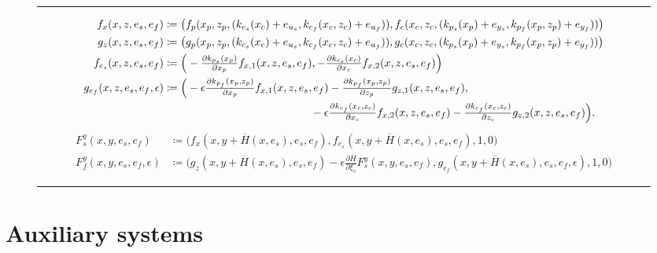 \begin{figure*}[!htp]
	\hrule
    \scriptsize %
	\begin{equation}\label{eq:functions}
    \begin{aligned}
		f_x(x,z,e_s,e_f) &\coloneqq 
    \big(
    f_p(x_p,z_p,(k_{c_s}(x_c)+e_{u_s},k_{c_f}(x_c,z_c)+e_{u_f}) ),
    f_c(x_c,z_c,(k_{p_s}(x_p)+e_{y_s},k_{p_f}(x_p,z_p)+e_{y_f}) )
    \big)  \\
    g_z(x,z,e_s,e_f) &\coloneqq 
    \big(
    g_p(x_p,z_p,(k_{c_s}(x_c)+e_{u_s},k_{c_f}(x_c,z_c)+e_{u_f}) ) ,
    g_c(x_c,z_c,(k_{p_s}(x_p)+e_{y_s},k_{p_f}(x_p,z_p)+e_{y_f} ) )
    \big)  \\
    f_{e_s}(x,z,e_s,e_f) &\coloneqq
    \Big(- \tfrac{\partial k_{p_s}(x_p)}{\partial x_p} 
        f_{x,1}(x,z,e_s,e_f), 
    - \tfrac{\partial k_{c_s}(x_c)}{\partial x_c} 
        f_{x,2}(x,z,e_s,e_f)\Big)  \\
        g_{e_f}(x,z,e_s,e_f,\epsilon) &\coloneqq \Big(  -\epsilon \tfrac{\partial k_{p_f}(x_p,z_p)}{\partial x_p}  f_{x,1}(x,z,e_s,e_f)  - \tfrac{\partial k_{p_f}(x_p,z_p)}{\partial z_p} g_{z,1}(x,z,e_s,e_f) , \\
        &\hspace{4.7cm}  - \epsilon \tfrac{\partial k_{c_f}(x_c,z_c)}{\partial x_c}  f_{x,2}(x,z,e_s,e_f) -\tfrac{\partial k_{c_f}(x_c,z_c)}{\partial z_c} g_{z,2}(x,z,e_s,e_f)\Big).  
    \end{aligned}
    \end{equation}
    \begin{equation}\label{eq:functions 2}
    \begin{aligned}
    F_s^y(x,y,e_s,e_f) &\coloneqq \big(f_x(x,y+\overline{H}(x,e_s),e_s, e_f ), f_{e_s}(x,y+\overline{H}(x,e_s),e_s, e_f ),1,0\big) 
    \\
    F_f^y(x,y,e_s,e_f,\epsilon) &\coloneqq \big(
      g_z(x,y+\overline{H}(x,e_s),e_s,e_f)- \epsilon \tfrac{\partial \overline{H}}{\partial \xi_s} F_s^y(x,y,e_s,e_f ),
      g_{e_f}(x,y+\overline{H}(x,e_s),e_s, e_f , \epsilon),1,0 \big)
    \end{aligned}
    \end{equation}
    \normalsize
	\hrule
\end{figure*}
%



\section{Auxiliary systems}


